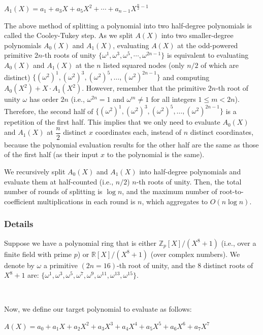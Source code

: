 $A_1(X) = a_1 + a_3X + a_5X^2 + \cdots + a_{n-1}X^{\frac{n}{2} - 1}$

The above method of splitting a polynomial into two half-degree polynomials is called the Cooley-Tukey step. As we split $A(X)$ into two smaller-degree polynomials $A_0(X)$ and $A_1(X)$, evaluating $A(X)$ at the odd-powered primitive $2n$-th roots of unity $\{\omega^1, \omega^3, \omega^5, \cdots, \omega^{2n-1}\}$ is equivalent to evaluating $A_0(X)$ and $A_1(X)$ at the $n$ listed squared nodes (only $n/2$ of which are distinct) $\{(\omega^2)^1, (\omega^2)^3, (\omega^2)^5, \ldots, (\omega^2)^{2n-1}\}$ and computing $A_0(X^2) + X\cdot A_1(X^2)$. However, remember that the primitive $2n$-th root of unity $\omega$ has order $2n$ (i.e., $\omega^{2n} = 1$ and $\omega^m \neq 1$ for all integers $1\le m < 2n$). Therefore, the second half of $\{(\omega^2)^1, (\omega^2)^3, (\omega^2)^5, \ldots, (\omega^2)^{2n-1}\}$ is a repetition of the first half. This implies that we only need to evaluate $A_0(X)$ and $A_1(X)$ at $\dfrac{n}{2}$ distinct $x$ coordinates each, instead of $n$ distinct coordinates, because the polynomial evaluation results for the other half are the same as those of the first half (as their input $x$ to the polynomial is the same).

We recursively split $A_0(X)$ and $A_1(X)$ into half-degree polynomials and evaluate them at half-counted (i.e., $n/2$) $n$-th roots of unity. Then, the total number of rounds of splitting is $\log n$, and the maximum number of root-to-coefficient multiplications in each round is $n$, which aggregates to $O(n \log n)$. 

\subsubsection{Details}
\label{subsec:ntt-forward-details}

Suppose we have a polynomial ring that is either $\mathbb{Z}_{p}[X] / (X^8 + 1)$ (i.e., over a finite field with prime $p$) or $\mathbb{R}[X] / (X^8 + 1)$ (over complex numbers). 
We denote by $\omega$ a primitive $(2n=16)$-th root of unity, and 
the 8 distinct roots of $X^8 + 1$ are: $\{\omega^1, \omega^3, \omega^5, \omega^7, \omega^9, \omega^{11}, \omega^{13}, \omega^{15}\}$.

$ $

Now, we define our target polynomial to evaluate as follows: 

$A(X) = a_0 + a_1X + a_2X^2 + a_3X^3 + a_4X^4 + a_5X^5 + a_6X^6 + a_7X^7$

